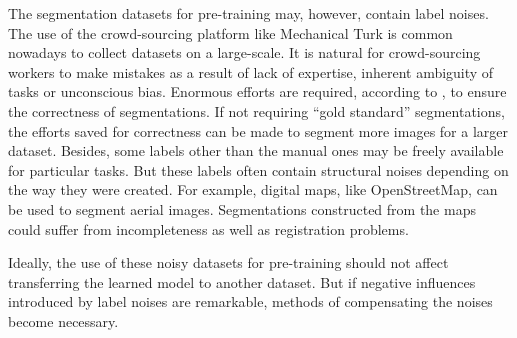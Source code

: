 
The segmentation datasets for pre-training may, however, contain label noises.
The use of the crowd-sourcing platform like Mechanical Turk is common nowadays to collect datasets on a large-scale.
It is natural for crowd-sourcing workers to make mistakes as a result of lack of expertise, inherent ambiguity of tasks or unconscious bias.
Enormous efforts are required, according to  \cite{lin2014microsoft,everingham2015pascal}, to ensure the correctness of segmentations.
If not requiring ``gold standard'' segmentations, the efforts saved for correctness can be made to segment more images for a larger dataset.
Besides,  some labels other than the manual ones may be freely available for particular tasks.
But these labels often contain structural noises depending on the way they were created.
For example, digital maps, like OpenStreetMap, can be used to segment aerial images.
Segmentations constructed from the maps could suffer from incompleteness as well as registration problems. \cite{mnih2012learning}

Ideally, the use of these noisy datasets for pre-training should not affect transferring the learned model to another dataset.
But if negative influences introduced by label noises are remarkable, methods of compensating the noises become necessary.



